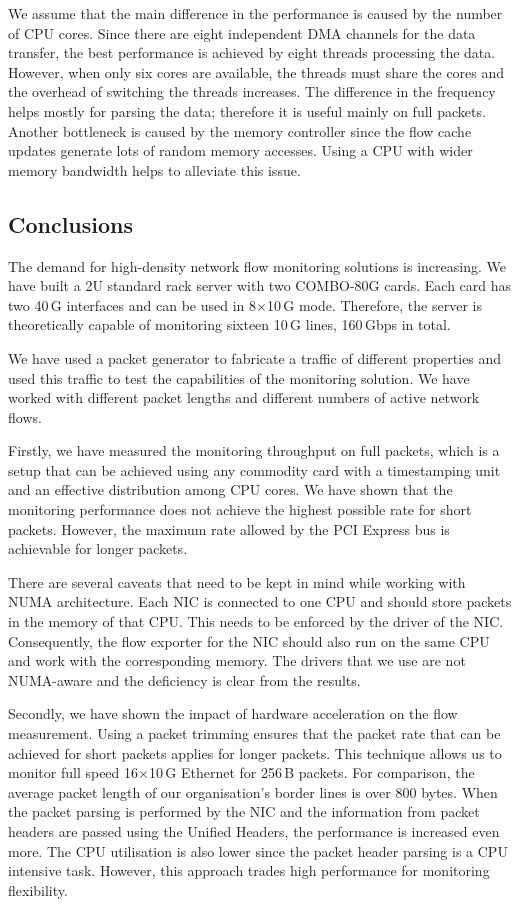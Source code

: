 We assume that the main difference in the performance is caused by the number of CPU cores. Since there are eight independent DMA channels for the data transfer, the best performance is achieved by eight threads processing the data. However, when only six cores are available, the threads must share the cores and the overhead of switching the threads increases. The difference in the frequency helps mostly for parsing the data; therefore it is useful mainly on full packets. Another bottleneck is caused by the memory controller since the flow cache updates generate lots of random memory accesses. Using a CPU with wider memory bandwidth helps to alleviate this issue.

\subsection{Conclusions} \label{subsec:high-density-conclusions}

The demand for high-density network flow monitoring solutions is increasing. We have built a 2U standard rack server with two COMBO-80G cards. Each card has two 40\,G interfaces and can be used in 8$\times$10\,G mode. Therefore, the server is theoretically capable of monitoring sixteen 10\,G lines, 160\,Gbps in total.

We have used a packet generator to fabricate a traffic of different properties and used this traffic to test the capabilities of the monitoring solution. We have worked with different packet lengths and different numbers of active network flows.

Firstly, we have measured the monitoring throughput on full packets, which is a setup that can be achieved using any commodity card with a timestamping unit and an effective distribution among CPU cores. We have shown that the monitoring performance does not achieve the highest possible rate for short packets. However, the maximum rate allowed by the PCI Express bus is achievable for longer packets.

There are several caveats that need to be kept in mind while working with NUMA architecture. Each NIC is connected to one CPU and should store packets in the memory of that CPU. This needs to be enforced by the driver of the NIC. Consequently, the flow exporter for the NIC should also run on the same CPU and work with the corresponding memory. The drivers that we use are not NUMA-aware and the deficiency is clear from the results.

Secondly, we have shown the impact of hardware acceleration on the flow measurement. Using a packet trimming ensures that the packet rate that can be achieved for short packets applies for longer packets. This technique allows us to monitor full speed 16$\times$10\,G Ethernet for 256\,B packets. For comparison, the average packet length of our organisation's border lines is over 800 bytes. When the packet parsing is performed by the NIC and the information from packet headers are passed using the Unified Headers, the performance is increased even more. The CPU utilisation is also lower since the packet header parsing is a CPU intensive task. However, this approach trades high performance for monitoring flexibility.

